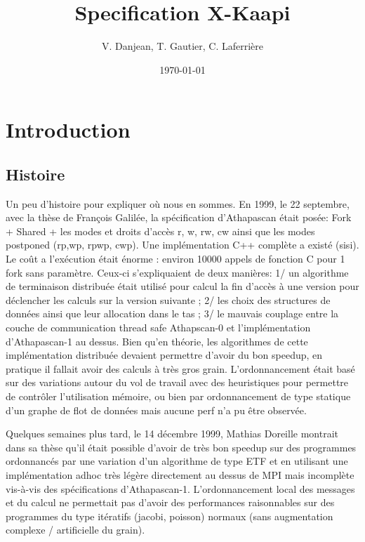 \documentclass[12pt]{report}
\begin{document}
\title{Specification X-Kaapi}
\author{V. Danjean, T. Gautier, C. Laferrière}
\date{\today}
\maketitle

\newpage
\chapter{Introduction}


\section{Histoire}
Un peu d'histoire pour expliquer où nous en sommes.
En 1999, le 22 septembre, avec la thèse de François Galilée, la spécification d'Athapascan était posée: Fork + Shared + les modes et droits d'accès r, w, rw, cw ainsi que les modes postponed (rp,wp, rpwp, cwp). Une implémentation C++ complète a existé (sisi). Le coût a l'exécution était énorme : environ 10000 appels de fonction C pour 1 fork sans paramètre. Ceux-ci s'expliquaient de deux manières: 1/ un algorithme de terminaison distribuée était utilisé pour calcul la fin d'accès à une version pour déclencher les calculs sur la version suivante ; 2/ les choix des structures de données ainsi que leur allocation dans le tas ; 3/ le mauvais couplage entre la couche de communication thread safe Athapscan-0 et l'implémentation d'Athapascan-1 au dessus. Bien qu'en théorie, les algorithmes de cette implémentation distribuée devaient permettre d'avoir du bon speedup, en pratique il fallait avoir des calculs à très gros grain. L'ordonnancement était basé sur des variations autour du vol de travail avec des heuristiques pour permettre de contrôler l'utilisation mémoire, ou bien par ordonnancement de type statique d'un graphe de flot de données mais aucune perf n'a pu être observée.

Quelques semaines plus tard, le 14 décembre 1999, Mathias Doreille montrait dans sa thèse qu'il était possible d'avoir de très bon speedup sur des programmes ordonnancés par une variation d'un algorithme de type ETF et en utilisant une implémentation adhoc très légère directement au dessus de MPI mais incomplète vis-à-vis des spécifications d'Athapascan-1. L'ordonnancement local des messages et du calcul ne permettait pas d'avoir des performances raisonnables sur des programmes du type itératifs (jacobi, poisson) normaux (sans augmentation complexe / artificielle du grain).
\end{document}
